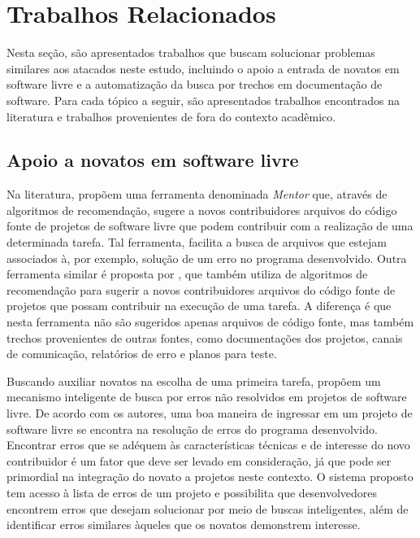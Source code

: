 
\section{Trabalhos Relacionados}
\label{cap:related-work}
Nesta seção, são apresentados trabalhos que buscam solucionar problemas similares aos atacados neste estudo, incluindo o apoio a entrada de novatos em software livre e a automatização da busca por trechos em documentação de software. Para cada tópico a seguir, são apresentados trabalhos encontrados na literatura e trabalhos provenientes de fora do contexto acadêmico.

\label{cap:related-work}
\subsection{Apoio a novatos em software livre}

Na literatura, \citet{malheiros2012changes} propõem uma ferramenta denominada \textit{Mentor} que, através de algoritmos de recomendação, sugere a novos contribuidores arquivos do código fonte de projetos de software livre que podem contribuir com a realização de uma determinada tarefa. Tal ferramenta, facilita a busca de arquivos que estejam associados à, por exemplo, solução de um erro no programa desenvolvido. Outra ferramenta similar é proposta por \citet{cubranic2005hipikat}, que também utiliza de algoritmos de recomendação para sugerir a novos contribuidores arquivos do código fonte de projetos que possam contribuir na execução de uma tarefa. A diferença é que nesta ferramenta não são sugeridos apenas arquivos de código fonte, mas também trechos provenientes de outras fontes, como documentações dos projetos, canais de comunicação, relatórios de erro e planos para teste.  

Buscando auxiliar novatos na escolha de uma primeira tarefa, \citet{wang2011which} propõem um mecanismo inteligente de busca por erros não resolvidos em projetos de software livre. De acordo com os autores, uma boa maneira de ingressar em um projeto de software livre se encontra na resolução de erros do programa desenvolvido.  Encontrar erros que se adéquem às características técnicas e de interesse do novo contribuidor é um fator que deve ser levado em consideração, já que pode ser primordial na integração do novato a projetos neste contexto. O sistema proposto tem acesso à lista de erros de um projeto e possibilita que desenvolvedores encontrem erros que desejam solucionar por meio de buscas inteligentes, além de identificar erros similares àqueles que os novatos demonstrem interesse.

